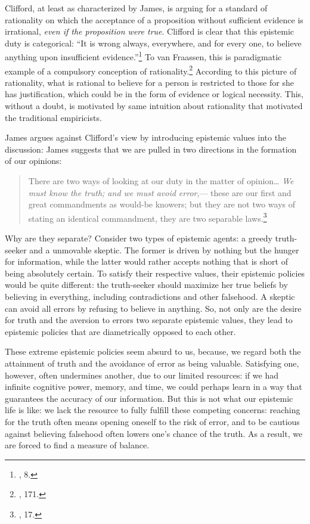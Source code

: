 Clifford, at least as characterized by James, is arguing for a standard
of rationality on which the acceptance of a proposition without
sufficient evidence is irrational, \emph{even if the proposition were
true}. Clifford is clear that this epistemic duty is categorical: ``It
is wrong always, everywhere, and for every one, to believe anything upon
insufficient evidence.''\footnote{\cite{jameswill}, 8.} To van
Fraassen, this is paradigmatic example of a compulsory conception of
rationality.\footnote{\cite{bvflaws}, 171.}
According to this picture of rationality, what is rational to believe
for a person is restricted to those for she has justification, which
could be in the form of evidence or logical necessity. This, without a
doubt, is motivated by same intuition about rationality that motivated
the traditional empiricists.

James argues against Clifford's view by introducing epistemic values
into the discussion: James suggests that we are pulled in two directions
in the formation of our opinions:

\begin{quote}
There are two ways of looking at our duty in the matter of
opinion\ldots{} \emph{We must know the truth; and we must avoid
error},--- these are our first and great commandments as would-be
knowers; but they are not two ways of stating an identical commandment,
they are two separable laws.\footnote{\cite{jameswill}, 17.}
\end{quote}

Why are they separate? Consider two types of epistemic agents: a greedy
truth-seeker and a unmovable skeptic. The former is driven by nothing
but the hunger for information, while the latter would rather accepts
nothing that is short of being absolutely certain. To satisfy their
respective values, their epistemic policies would be quite different:
the truth-seeker should maximize her true beliefs by believing in
everything, including contradictions and other falsehood. A skeptic can
avoid all errors by refusing to believe in anything. So, not only are
the desire for truth and the aversion to errors two separate epistemic
values, they lead to epistemic policies that are diametrically opposed
to each other.

These extreme epistemic policies seem absurd to us, because, we regard
both the attainment of truth and the avoidance of error as being
valuable. Satisfying one, however, often undermines another, due to our
limited resources: if we had infinite cognitive power, memory, and time,
we could perhaps learn in a way that guarantees the accuracy of our
information. But this is not what our epistemic life is like: we lack
the resource to fully fulfill these competing concerns: reaching for the
truth often means opening oneself to the risk of error, and to be
cautious against believing falsehood often lowers one's chance of the
truth. As a result, we are forced to find a measure of balance.


